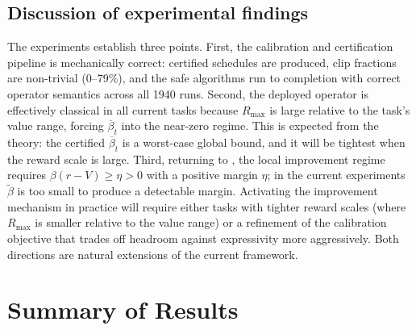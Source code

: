 \documentclass{article}
\theoremstyle{remark}
\begin{document}
\subsection{Discussion of experimental findings}
\label{sec:exp-discussion}

The experiments establish three points.
First, the calibration and certification pipeline is mechanically correct: certified schedules are produced, clip fractions are non-trivial (0--79\%), and the safe algorithms run to completion with correct operator semantics across all 1940 runs.
Second, the deployed operator is effectively classical in all current tasks because $R_{\max}$ is large relative to the task's value range, forcing $\overline\beta_t$ into the near-zero regime.
This is expected from the theory: the certified $\overline\beta_t$ is a worst-case global bound, and it will be tightest when the reward scale is large.
Third, returning to , the local improvement regime requires $\beta(r-V)\ge\eta>0$ with a positive margin $\eta$; in the current experiments $\widetilde\beta$ is too small to produce a detectable margin.
Activating the improvement mechanism in practice will require either tasks with tighter reward scales (where $R_{\max}$ is smaller relative to the value range) or a refinement of the calibration objective that trades off headroom against expressivity more aggressively.
Both directions are natural extensions of the current framework.

\clearpage
\section{Summary of Results}
\label{sec:summary}
\end{document}
